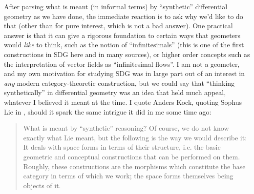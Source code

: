 After parsing what is meant (in informal terms) by ``synthetic'' differential geometry as we have done, the immediate reaction is to ask why we'd like to do that (other than for pure interest, which is not a bad answer). One practical answer is that it can give a rigorous foundation to certain ways that geometers would \emph{like} to think, such as the notion of ``infinitesimals'' (this is one of the first constructions in SDG here and in many sources), or higher order concepts such as the interpretation of vector fields as ``infinitesimal flows''. I am not a geometer, and my own motivation for studying SDG was in large part out of an interest in \emph{any} modern category-theoretic construction, but we could say that ``thinking synthetically'' in differential geometry was an idea that held much appeal, whatever I believed it meant at the time. I quote Anders Kock, quoting Sophus Lie in \cite{kock06}, should it spark the same intrigue it did in me some time ago:
\begin{quote}
  What is meant by “synthetic” reasoning? Of course, we do not know exactly what Lie meant, but the following is the way we would describe it: It deals with space forms in terms of their structure, i.e. the basic geometric and conceptual constructions that can be performed on them. Roughly, these constructions are the morphisms which constitute the base category in terms of which we work; the space forms themselves being objects of it.
\end{quote}
